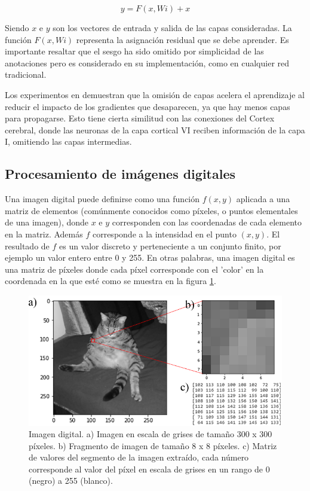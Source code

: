         \begin{equation}
            \label{EQ:ResNetShortcut}
            y = F(x, {Wi}) + x
        \end{equation}
        
        Siendo $x$ e $y$ son los vectores de entrada y salida de las capas consideradas. La función $F (x, {Wi})$ representa la asignación residual que se debe aprender. Es importante resaltar que el sesgo ha sido omitido por simplicidad de las anotaciones pero es considerado en su implementación, como en cualquier red tradicional.
        
        Los experimentos en \cite{Kaiming2015} demuestran que la omisión de capas acelera el aprendizaje al reducir el impacto de los gradientes que desaparecen, ya que hay menos capas para propagarse. Esto tiene cierta similitud con las conexiones del Cortex cerebral, donde las neuronas de la capa cortical VI reciben información de la capa I, omitiendo las capas intermedias.
        
    \subsection{Procesamiento de imágenes digitales}
    \label{sub:FrameImagesProccesing}
    
        Una imagen digital puede definirse como una función $f(x, y)$ aplicada a una matriz de elementos (comúnmente conocidos como píxeles, o puntos elementales de una imagen), donde $x$ e $y$ corresponden con las coordenadas de cada elemento en la matriz. Además $f$ corresponde a la intensidad en el punto $(x, y)$. El resultado de $f$ es un valor discreto y perteneciente a un conjunto finito, por ejemplo un valor entero entre 0 y 255. En otras palabras, una imagen digital es una matriz de píxeles donde cada píxel corresponde con el 'color' en la coordenada en la que esté como se muestra en la figura \ref{fig:DigitalImage}.
            
        \begin{figure}[ht!]
        	\centering
        	\includegraphics[width=0.7\linewidth]{imgs/02-Referential/02-ImagesDetails.png}
        	\caption[Imagen digital]{Imagen digital. a) Imagen en escala de grises de tamaño 300 x 300 píxeles. b) Fragmento de imagen de tamaño 8 x 8 píxeles. c) Matriz de valores del segmento de la imagen extraído, cada número corresponde al valor del píxel en escala de grises en un rango de 0 (negro) a 255 (blanco).}
    	    \label{fig:DigitalImage}
        \end{figure}%
        
